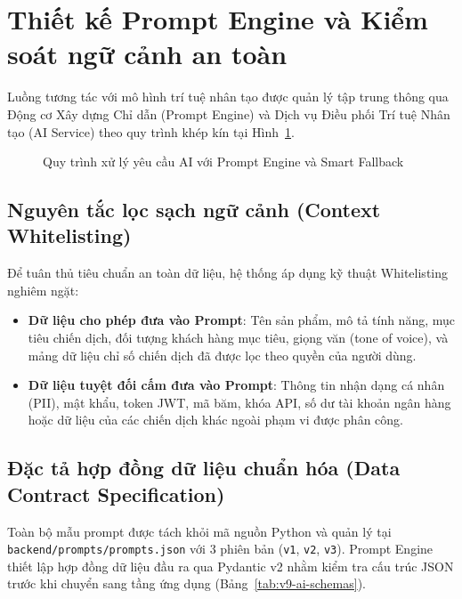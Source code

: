 \section{Thiết kế Prompt Engine và Kiểm soát ngữ cảnh an toàn}

Luồng tương tác với mô hình trí tuệ nhân tạo được quản lý tập trung thông qua Động cơ Xây dựng Chỉ dẫn (Prompt Engine) và Dịch vụ Điều phối Trí tuệ Nhân tạo (AI Service) theo quy trình khép kín tại Hình~\ref{fig:v9-ai-pipeline}.

\begin{figure}[H]
\centering

\caption{Quy trình xử lý yêu cầu AI với Prompt Engine và Smart Fallback}
\label{fig:v9-ai-pipeline}
\end{figure}

\subsection{Nguyên tắc lọc sạch ngữ cảnh (Context Whitelisting)}
Để tuân thủ tiêu chuẩn an toàn dữ liệu, hệ thống áp dụng kỹ thuật Whitelisting nghiêm ngặt:
\begin{itemize}
  \item \textbf{Dữ liệu cho phép đưa vào Prompt}: Tên sản phẩm, mô tả tính năng, mục tiêu chiến dịch, đối tượng khách hàng mục tiêu, giọng văn (tone of voice), và mảng dữ liệu chỉ số chiến dịch đã được lọc theo quyền của người dùng.
  \item \textbf{Dữ liệu tuyệt đối cấm đưa vào Prompt}: Thông tin nhận dạng cá nhân (PII), mật khẩu, token JWT, mã băm, khóa API, số dư tài khoản ngân hàng hoặc dữ liệu của các chiến dịch khác ngoài phạm vi được phân công.
\end{itemize}

\subsection{Đặc tả hợp đồng dữ liệu chuẩn hóa (Data Contract Specification)}
Toàn bộ mẫu prompt được tách khỏi mã nguồn Python và quản lý tại \texttt{backend/\allowbreak prompts/\allowbreak prompts.json} với 3 phiên bản (\texttt{v1}, \texttt{v2}, \texttt{v3}). Prompt Engine thiết lập hợp đồng dữ liệu đầu ra qua Pydantic v2 nhằm kiểm tra cấu trúc JSON trước khi chuyển sang tầng ứng dụng (Bảng~\ref{tab:v9-ai-schemas}).

